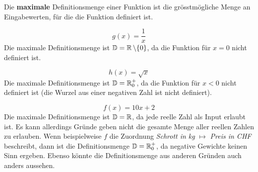 \begin{deff}{}
    Die \textbf{maximale} Definitionsmenge einer Funktion ist die grösstmögliche Menge an Eingabewerten, für die die Funktion definiert ist.
\end{deff}

\begin{example}
    \[g(x) = \dfrac{1}{x}\]
    Die maximale Definitionsmenge ist $\operatorname{\mathbb{D}} = \operatorname{\mathbb{R}} \setminus \{0\}$, da die Funktion für $x=0$ nicht definiert ist.
\end{example}

\begin{example}
    \[h(x) = \sqrt{x}\]
    Die maximale Definitionsmenge ist $\operatorname{\mathbb{D}} = \operatorname{\mathbb{R}}_0^+$, da die Funktion für $x<0$ nicht definiert ist (die Wurzel aus einer negativen Zahl ist nicht definiert).
\end{example}

\begin{example}
    \[f(x)=10x +2\]
    Die maximale Definitionsmenge ist $\operatorname{\mathbb{D}} = \operatorname{\mathbb{R}}$, da jede reelle Zahl als Input erlaubt ist. Es kann allerdings Gründe geben nicht die gesamte Menge aller reellen Zahlen zu erlauben. Wenn beispielweise $f$ die Zuordnung \textit{Schrott in kg} $\mapsto$ \textit{Preis in CHF} beschreibt, dann ist die Definitionsmenge $\operatorname{\mathbb{D}} = \operatorname{\mathbb{R}}^+_0$, da negative Gewichte keinen Sinn ergeben. Ebenso könnte die Definitionsmenge aus anderen Gründen auch anders aussehen.
\end{example}
